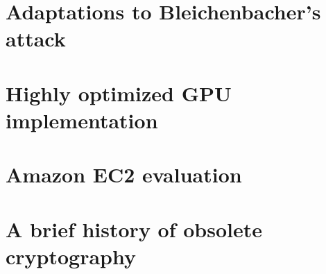 \fi

\section{Adaptations to Bleichenbacher's attack}



\ifext
\section{Highly optimized GPU implementation}

\fi

\ifext
\section{Amazon EC2 evaluation}

\fi

\ifext
\section{A brief history of obsolete cryptography}

\fi
